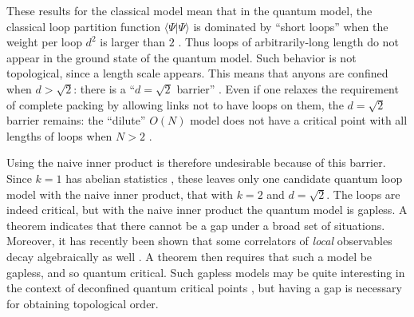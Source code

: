 \documentclass[11pt]{article}
\begin{document}
These results for the classical model mean that in the quantum model,
the classical loop partition function $\langle
\Psi|\Psi\rangle$ is dominated by ``short loops'' when the weight per
loop $d^2$ is larger than $2$ \cite{Nienhuis}. Thus loops of
arbitrarily-long length do not appear in the ground state of the
quantum model.  Such behavior is not topological, since a length scale
appears. This means that anyons are confined when $d>\sqrt{2}$: there
is a ``$d=\sqrt{2}$ barrier'' \cite{Freedman01,FNS}.  Even if one
relaxes the requirement of complete packing by allowing links not to
have loops on them, the $d=\sqrt{2}$ barrier remains: the ``dilute''
$O(N)$ model does not have a critical point with all lengths of loops
when $N>2$ \cite{Nienhuis}.



Using the naive inner product is therefore undesirable because of this
barrier. Since $k=1$ has abelian statistics \cite{Kitaev97}, these
leaves only one candidate quantum loop model with the naive inner
product, that with $k=2$ and $d=\sqrt{2}$. The loops are indeed
critical, but with the naive inner product the quantum model is
gapless. A theorem \cite{FNS} indicates that there cannot be a gap
under a broad set of situations.  Moreover, it has recently been shown
that some correlators of {\em local} observables decay algebraically
as well \cite{NSTT}. A theorem \cite{Hastings} then requires that such
a model be gapless, and so quantum critical.  Such gapless models
may be quite interesting in the context of deconfined quantum critical
points \cite{Senthil}, but having a gap is necessary for obtaining
topological order.
\end{document}
